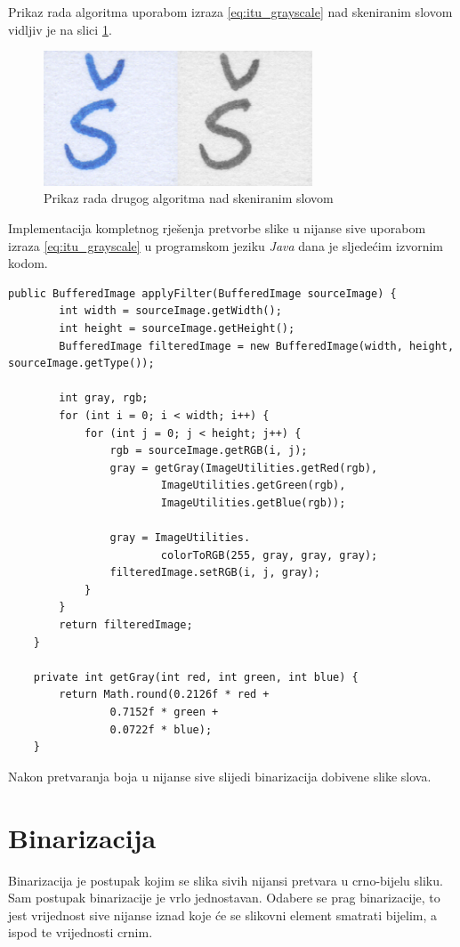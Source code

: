 Prikaz rada algoritma uporabom izraza \eqref{eq:itu_grayscale} nad skeniranim slovom vidljiv je na slici \ref{fig:grayscale_char_example}.

\begin{figure}[htb]
    \centering
    \includegraphics[width=8cm]{images/char_grayscale_example.png}
    \caption{Prikaz rada drugog algoritma nad skeniranim slovom}
    \label{fig:grayscale_char_example}
\end{figure}

Implementacija kompletnog rješenja pretvorbe slike u nijanse sive uporabom izraza \eqref{eq:itu_grayscale} u programskom jeziku \emph{Java} dana je sljedećim izvornim kodom.
\lstset{language=Java, tabsize=2}
\begin{lstlisting}
public BufferedImage applyFilter(BufferedImage sourceImage) {
        int width = sourceImage.getWidth();
        int height = sourceImage.getHeight();
        BufferedImage filteredImage = new BufferedImage(width, height, sourceImage.getType());

        int gray, rgb;
        for (int i = 0; i < width; i++) {
            for (int j = 0; j < height; j++) {
                rgb = sourceImage.getRGB(i, j);
                gray = getGray(ImageUtilities.getRed(rgb),
                        ImageUtilities.getGreen(rgb),
                        ImageUtilities.getBlue(rgb));

                gray = ImageUtilities.
                        colorToRGB(255, gray, gray, gray);
                filteredImage.setRGB(i, j, gray);
            }
        }
        return filteredImage;
    }
    
    private int getGray(int red, int green, int blue) {
        return Math.round(0.2126f * red +
                0.7152f * green +
                0.0722f * blue);
    }
\end{lstlisting}

Nakon pretvaranja boja u nijanse sive slijedi binarizacija dobivene slike slova.

\section{Binarizacija}
Binarizacija je postupak kojim se slika sivih nijansi pretvara u crno-bijelu sliku. Sam postupak binarizacije je vrlo jednostavan. Odabere se prag binarizacije, to jest vrijednost sive nijanse iznad koje će se slikovni element smatrati bijelim, a ispod te vrijednosti crnim. 

